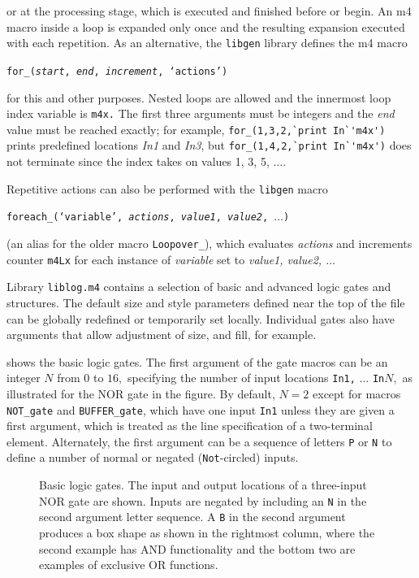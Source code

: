 \noindent
or at the \Mfour processing stage, which is executed and finished
before \dpic or \gpic begin.  An m4 macro inside a \pic loop is
expanded only once and the resulting expansion executed with each
\pic repetition.  As an alternative,
the {\tt libgen} library defines the m4 macro

{\tt for\_({\sl start}, {\sl end}, {\sl increment}, `{\sl actions}')}

\noindent
for this and other purposes.  Nested loops are allowed and the innermost loop
index variable is {\tt m4x.}
The first three arguments must be
integers and the {\sl end} value must be reached exactly; for example,
\verb|for_(1,3,2,`print In`'m4x')| prints predefined locations
{\sl In1} and {\sl In3},
but \verb|for_(1,4,2,`print In`'m4x')| does not terminate since the
index takes on values 1, 3, 5, $\ldots$.

Repetitive actions can also be performed with the {\tt libgen} macro

{\tt foreach\_(`{\sl variable}', {\sl actions}, {\sl value1},
 {\sl value2}, $\ldots$)}

\noindent
(an alias for the older macro {\tt Loopover\_}),
which evaluates {\sl actions} and increments counter {\tt m4Lx}
for each instance of {\sl variable} set to {\sl value1, value2, $\ldots$}

\vspace*{-0.5\baselineskip}
Library {\tt liblog.m4} contains a selection of basic and advanced logic
gates and structures.  The default size and style parameters defined
near the top of the file can be globally redefined or temporarily set
locally. Individual gates also have arguments that allow adjustment of
size, and fill, for example.

 shows the basic logic gates.  The first argument of the gate
macros can be an integer $N$ from $0$ to $16,$ specifying the number
of input locations {\tt In1,} $\ldots$ {\tt In}$N,$ as illustrated
for the NOR gate in the figure.  By default, $N=2$ except for macros
{\tt NOT\_gate} and {\tt BUFFER\_gate}, which have one input {\tt In1}
unless they are given a first argument, which is treated as the line
specification of a two-terminal element. Alternately, the first argument
can be a sequence of letters {\tt P} or {\tt N} to define a number of
normal or negated ({\tt Not}-circled) inputs. 
\begin{figure}[H]
   \vspace*{-0.5\baselineskip}
   
   \caption{Basic logic gates.  The input and output locations of
      a three-input NOR gate are shown.  Inputs are negated by
      including an {\tt N} in the second argument letter sequence.  A {\tt B}
      in the second argument produces a box shape as shown in the rightmost
      column, where the second example has AND functionality and
      the bottom two are examples of exclusive OR functions.}
   \label{Logic}
   \end{figure}


